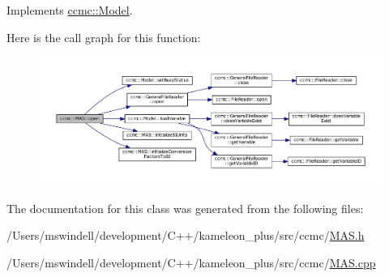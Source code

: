 Implements \hyperlink{classccmc_1_1_model_a3c64dc635c2c1a2fe2f8efa2a3666282}{ccmc\-::\-Model}.



Here is the call graph for this function\-:
\nopagebreak
\begin{figure}[H]
\begin{center}
\leavevmode
\includegraphics[width=350pt]{classccmc_1_1_m_a_s_a054e168c8a692b724471c0c3c775dc25_cgraph}
\end{center}
\end{figure}




The documentation for this class was generated from the following files\-:\begin{DoxyCompactItemize}
\item 
/\-Users/mswindell/development/\-C++/kameleon\-\_\-plus/src/ccmc/\hyperlink{_m_a_s_8h}{M\-A\-S.\-h}\item 
/\-Users/mswindell/development/\-C++/kameleon\-\_\-plus/src/ccmc/\hyperlink{_m_a_s_8cpp}{M\-A\-S.\-cpp}\end{DoxyCompactItemize}
